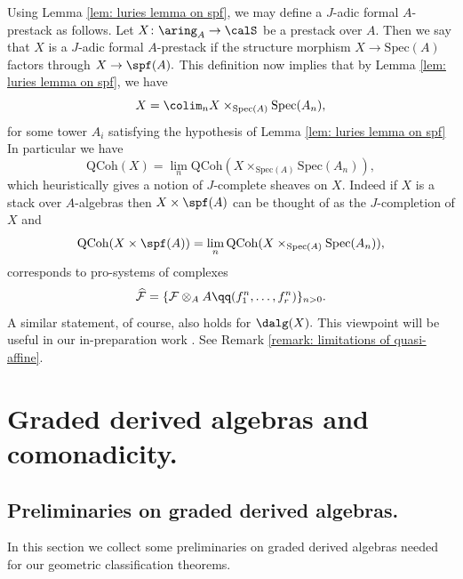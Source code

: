 \documentclass[10pt,reqno]{amsart}
\numberwithin{equation}{section}
\newcommand{\cF}{\mathcal{F}}
\newcommand{\spec}{{\mathrm{Spec}}}
\newcommand{\Qcoh}{\mathrm{QCoh}}
\begin{document}
\begin{remark}\label{remark: definition of formal stack}
    Using Lemma \ref{lem: luries lemma on spf}, we may define a $J$-adic formal $A$-prestack as follows. Let $X\colon \aring_A\to \calS$ be a prestack over $A$. Then we say that $X$ is a $J$-adic formal $A$-prestack if the structure morphism $X\to \spec(A)$ factors through $X\to \spf(A).$
    This definition now implies that by Lemma \ref{lem: luries lemma on spf}, we have $$X=\colim_n X\times_{\spec(A)} \spec(A_n),$$ for some tower $A_i$ satisfying the hypothesis of Lemma \ref{lem: luries lemma on spf}
    In particular we have $$\Qcoh(X)=\lim_n \Qcoh(X\times_{\spec(A)} \spec(A_n)),$$ which heuristically gives a notion of $J$-complete sheaves on $X$. 
    Indeed if $X$ is a stack over $A$-algebras then $X\times \spf(A)$ can be thought of as the $J$-completion of $X$ and 
    $$\Qcoh(X\times \spf(A))=\lim_n \Qcoh(X\times_{\spec(A)} \spec(A_n)),$$ corresponds to pro-systems of complexes $$\widehat{\cF}= \{\cF\otimes_A A\qq (f_1^n,\ldots, f_r^n)\}_{n>0}.$$ 
    A similar statement, of course, also holds for $\dalg(X).$
    This viewpoint will be useful in our in-preparation work \cite{MundingerSahai_inprep}. See Remark \ref{remark: limitations of quasi-affine}.
\end{remark}

\section{Graded derived algebras and comonadicity.}\label{sec: graded dalg and comonads}


\subsection{Preliminaries on graded derived algebras.}
In this section we collect some preliminaries on graded derived algebras needed for our geometric classification theorems. 
\end{document}
